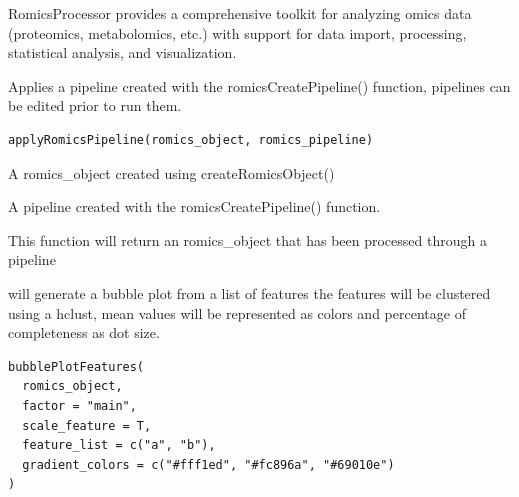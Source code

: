 \documentclass[a4paper]{book}
\begin{document}
%
\begin{Description}
RomicsProcessor provides a comprehensive toolkit for analyzing omics data (proteomics, metabolomics, etc.)
with support for data import, processing, statistical analysis, and visualization.
\end{Description}
%
\begin{Description}
Applies a pipeline created with the romicsCreatePipeline() function, pipelines can be edited prior to run them.
\end{Description}
%
\begin{Usage}
\begin{verbatim}
applyRomicsPipeline(romics_object, romics_pipeline)
\end{verbatim}
\end{Usage}
%
\begin{Arguments}
\begin{ldescription}
\item[\code{romics\_object}] A romics\_object created using createRomicsObject()

\item[\code{romics\_pipeline}] A pipeline created with the romicsCreatePipeline() function.
\end{ldescription}
\end{Arguments}
%
\begin{Value}
This function will return an romics\_object that has been processed through a pipeline
\end{Value}
%
\begin{Description}
will generate a bubble plot from a list of features the features will be clustered using a hclust, mean values will be represented as colors and percentage of completeness as dot size.
\end{Description}
%
\begin{Usage}
\begin{verbatim}
bubblePlotFeatures(
  romics_object,
  factor = "main",
  scale_feature = T,
  feature_list = c("a", "b"),
  gradient_colors = c("#fff1ed", "#fc896a", "#69010e")
)
\end{verbatim}
\end{Usage}
%
\end{document}
